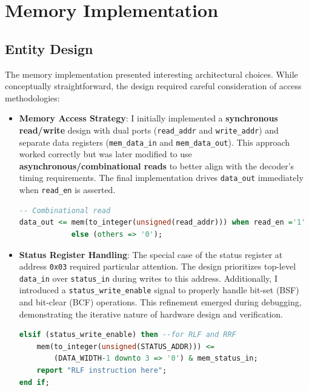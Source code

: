 
\newpage
\section{Memory Implementation}
\subsection{Entity Design}

The memory implementation presented interesting architectural choices. While conceptually straightforward, the design required careful consideration of access methodologies:

\begin{itemize}
    \item \textbf{Memory Access Strategy}: 
    I initially implemented a \textbf{synchronous read/write} design with dual ports (\texttt{read\_addr} and \texttt{write\_addr}) and separate data registers (\texttt{mem\_data\_in} and \texttt{mem\_data\_out}). This approach worked correctly but was later modified to use \textbf{asynchronous/combinational reads} to better align with the decoder's timing requirements. The final implementation drives \texttt{data\_out} immediately when \texttt{read\_en} is asserted.

    \begin{lstlisting}[language=VHDL, caption={Continuous assignment of data\_out enabling combinational reading}]
-- Combinational read
data_out <= mem(to_integer(unsigned(read_addr))) when read_en ='1' 
            else (others => '0'); 
    \end{lstlisting}

    \item \textbf{Status Register Handling}:
    The special case of the status register at address \texttt{0x03} required particular attention. The design prioritizes top-level \texttt{data\_in} over \texttt{status\_in} during writes to this address. Additionally, I introduced a \texttt{status\_write\_enable} signal to properly handle bit-set (BSF) and bit-clear (BCF) operations. This refinement emerged during debugging, demonstrating the iterative nature of hardware design and verification.

    \begin{lstlisting}[language=VHDL, caption={Use of status\_write\_enable}]
elsif (status_write_enable) then --for RLF and RRF
    mem(to_integer(unsigned(STATUS_ADDR))) <= 
        (DATA_WIDTH-1 downto 3 => '0') & mem_status_in;
    report "RLF instruction here";
end if;
    \end{lstlisting}
\end{itemize}

